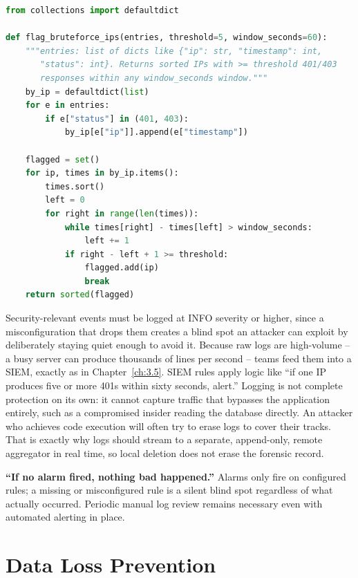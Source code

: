 \begin{lstlisting}[language=Python, caption={Flagging IPs exceeding a brute-force threshold from parsed log entries}]
from collections import defaultdict

def flag_bruteforce_ips(entries, threshold=5, window_seconds=60):
    """entries: list of dicts like {"ip": str, "timestamp": int,
       "status": int}. Returns sorted IPs with >= threshold 401/403
       responses within any window_seconds window."""
    by_ip = defaultdict(list)
    for e in entries:
        if e["status"] in (401, 403):
            by_ip[e["ip"]].append(e["timestamp"])

    flagged = set()
    for ip, times in by_ip.items():
        times.sort()
        left = 0
        for right in range(len(times)):
            while times[right] - times[left] > window_seconds:
                left += 1
            if right - left + 1 >= threshold:
                flagged.add(ip)
                break
    return sorted(flagged)
\end{lstlisting}

Security-relevant events must be logged at INFO severity or higher, since a misconfiguration that
drops them creates a blind spot an attacker can exploit by deliberately staying quiet enough to
avoid it. Because raw logs are high-volume -- a busy server can produce thousands of lines per
second -- teams feed them into a SIEM, exactly as in Chapter~\ref{ch:3.5}. SIEM rules apply logic
like ``if one IP produces five or more 401s within sixty seconds, alert.'' Logging is not complete
protection on its own: it cannot capture traffic that bypasses the application entirely, such as a
compromised insider reading the database directly. An attacker who achieves code execution will
often try to erase logs to cover their tracks. That is exactly why logs should stream to a separate,
append-only, remote aggregator in real time, so local deletion does not erase the forensic record.

\begin{misconception}
\textbf{``If no alarm fired, nothing bad happened.''} Alarms only fire on configured rules; a
missing or misconfigured rule is a silent blind spot regardless of what actually occurred. Periodic
manual log review remains necessary even with automated alerting in place.
\end{misconception}

\section{Data Loss Prevention}

